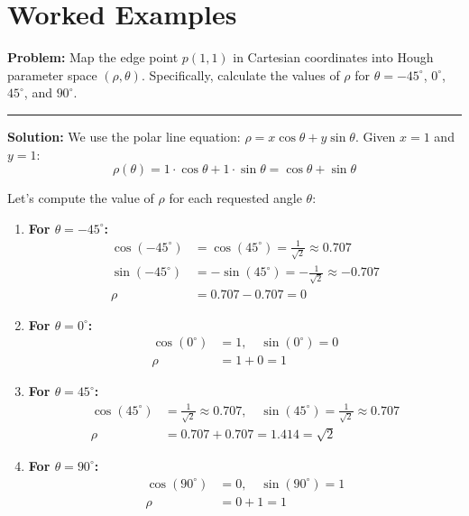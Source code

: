 \documentclass[12pt,a4paper]{article}
\begin{document}
\section{Worked Examples}

\begin{tcolorbox}[examplebox, title={Hough Transform Line Mapping}]
\textbf{Problem:} Map the edge point $p(1,1)$ in Cartesian coordinates into Hough parameter space $(\rho, \theta)$. Specifically, calculate the values of $\rho$ for $\theta = -45^\circ$, $0^\circ$, $45^\circ$, and $90^\circ$.

\par\noindent\rule{\linewidth}{0.5pt}\par
\textbf{Solution:}
We use the polar line equation: $\rho = x \cos\theta + y \sin\theta$.
Given $x = 1$ and $y = 1$:
\begin{equation*}
  \rho(\theta) = 1 \cdot \cos\theta + 1 \cdot \sin\theta = \cos\theta + \sin\theta
\end{equation*}

Let's compute the value of $\rho$ for each requested angle $\theta$:
\begin{enumerate}[leftmargin=*, itemsep=3.5pt]
  \item \textbf{For $\theta = -45^\circ$:}
    \begin{align*}
      \cos(-45^\circ) &= \cos(45^\circ) = \frac{1}{\sqrt{2}} \approx 0.707 \\
      \sin(-45^\circ) &= -\sin(45^\circ) = -\frac{1}{\sqrt{2}} \approx -0.707 \\
      \rho &= 0.707 - 0.707 = 0
    \end{align*}
  \item \textbf{For $\theta = 0^\circ$:}
    \begin{align*}
      \cos(0^\circ) &= 1, \quad \sin(0^\circ) = 0 \\
      \rho &= 1 + 0 = 1
    \end{align*}
  \item \textbf{For $\theta = 45^\circ$:}
    \begin{align*}
      \cos(45^\circ) &= \frac{1}{\sqrt{2}} \approx 0.707, \quad \sin(45^\circ) = \frac{1}{\sqrt{2}} \approx 0.707 \\
      \rho &= 0.707 + 0.707 = 1.414 = \sqrt{2}
    \end{align*}
  \item \textbf{For $\theta = 90^\circ$:}
    \begin{align*}
      \cos(90^\circ) &= 0, \quad \sin(90^\circ) = 1 \\
      \rho &= 0 + 1 = 1
    \end{align*}
\end{enumerate}


\end{tcolorbox}
\end{document}

